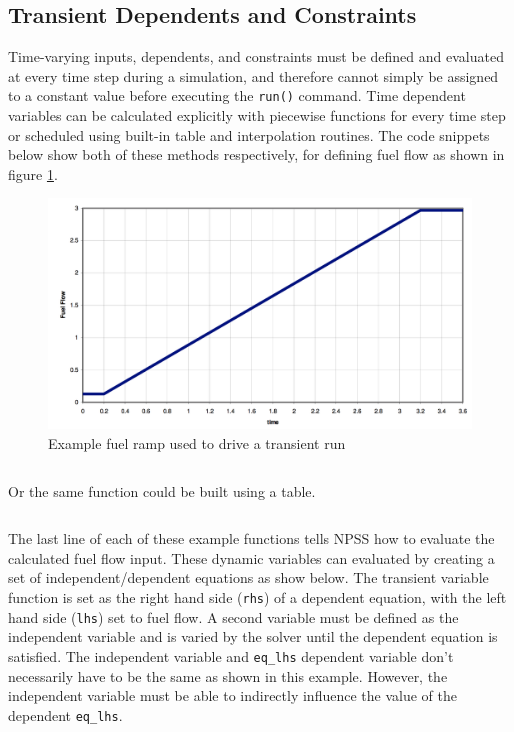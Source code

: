 \documentclass[heading.tex]{subfiles}
\begin{document}
\subsection{Transient Dependents and Constraints}

Time-varying inputs, dependents, and constraints must be defined and evaluated at every time step during a simulation, and therefore cannot simply be
assigned to a constant value before executing the \texttt{run()} command. Time dependent variables can be calculated explicitly with
piecewise functions for every time step or scheduled using built-in table and interpolation routines.
The code snippets below show both of these methods respectively, for defining fuel flow as shown in figure \ref{f:ramp}.

\begin{figure}[H]
\centering
\includegraphics[width=1.0\textwidth]{images/fuelRamp}
\caption{Example fuel ramp used to drive a transient run}
\label{f:ramp}
\end{figure}

\begin{adjustwidth}{-1cm}{-1cm}
 \inputminted[]{c++}{code/rampFn}
 \end{adjustwidth} 
 
Or the same function could be built using a table. 
 
 \begin{adjustwidth}{-1cm}{-1cm}
 \inputminted[]{c++}{code/rampTb}
 \end{adjustwidth} 

The last line of each of these example functions tells NPSS how to evaluate the calculated fuel flow input.
These dynamic variables can evaluated by creating a set of independent/dependent equations as show below.
The transient variable function is set as the right hand side (\texttt{rhs}) of a dependent equation,
with the left hand side (\texttt{lhs}) set to fuel flow. 
A second variable must be defined as the independent variable and is varied by the solver until the dependent
equation is satisfied.
The independent variable and \texttt{eq_lhs} dependent variable don't necessarily have to be the same
as shown in this example. However, the independent variable must be able to indirectly influence the
value of the dependent \texttt{eq_lhs}.
\end{document}
